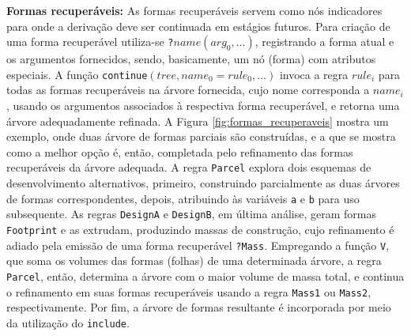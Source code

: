 \textbf{Formas recuperáveis:} As formas recuperáveis servem como nós indicadores para onde a derivação deve ser continuada em estágios futuros. Para criação de uma forma recuperável utiliza-se \texttt{?}$name(arg_0, ...)$, registrando a forma atual e os argumentos fornecidos, sendo, basicamente, um nó (forma) com atributos especiais. A função \texttt{continue}$(tree, name_0 = rule_0, ...)$ invoca a regra $rule_i$ para todas as formas recuperáveis na árvore fornecida, cujo nome corresponda a $name_i$, usando os argumentos associados à respectiva forma recuperável, e retorna uma árvore adequadamente refinada. A Figura \ref{fig:formas_recuperaveis} mostra um exemplo, onde duas árvore de formas parciais são construídas, e a que se mostra como a melhor opção é, então, completada pelo refinamento das formas recuperáveis da árvore adequada. A regra \texttt{Parcel} explora dois esquemas de desenvolvimento alternativos, primeiro, construindo parcialmente as duas árvores de formas correspondentes, depois, atribuindo às variáveis \texttt{a} e \texttt{b} para uso subsequente. As regras \texttt{DesignA} e \texttt{DesignB}, em última análise, geram formas \texttt{Footprint} e as extrudam, produzindo massas de construção, cujo refinamento é adiado pela emissão de uma forma recuperável \texttt{?Mass}. Empregando a função \texttt{V}, que soma os volumes das formas (folhas) de uma determinada árvore, a regra \texttt{Parcel}, então, determina a árvore com o maior volume de massa total, e continua o refinamento em suas formas recuperáveis usando a regra \texttt{Mass1} ou \texttt{Mass2}, respectivamente. Por fim, a árvore de formas resultante é incorporada por meio da utilização do \texttt{include}.

\begin{figure}[h!]
	\centering
	\captionsetup{width=15cm}
	{}
\end{figure}

